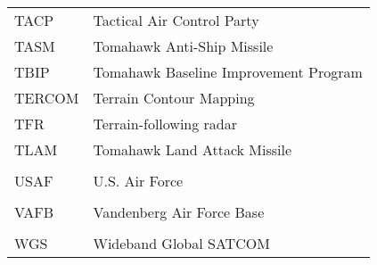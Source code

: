 \begin{supertabular}{ll}
TACP & Tactical Air Control Party \\
TASM & Tomahawk Anti-Ship Missile \\
TBIP & Tomahawk Baseline Improvement Program \\
TERCOM & Terrain Contour Mapping \\
TFR & Terrain-following radar \\
TLAM & Tomahawk Land Attack Missile \\
\\
USAF & U.S. Air Force \\
\\
VAFB & Vandenberg Air Force Base \\
\\
WGS & Wideband Global SATCOM \\
\end{supertabular}
